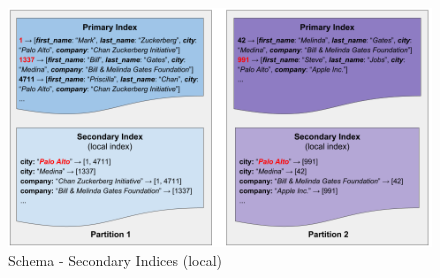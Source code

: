 {\begin{figure}[h]
	\centering
  \includegraphics[width=1\textwidth]{partitioning_secondary_indexes_local.png}
	\caption{Schema - Secondary Indices (local)}
	\label{partitioning_secondary_indexes_local}
\end{figure}

\newpage

\label{tf_dds_partitioning_secondary_indices_global_index}

}
